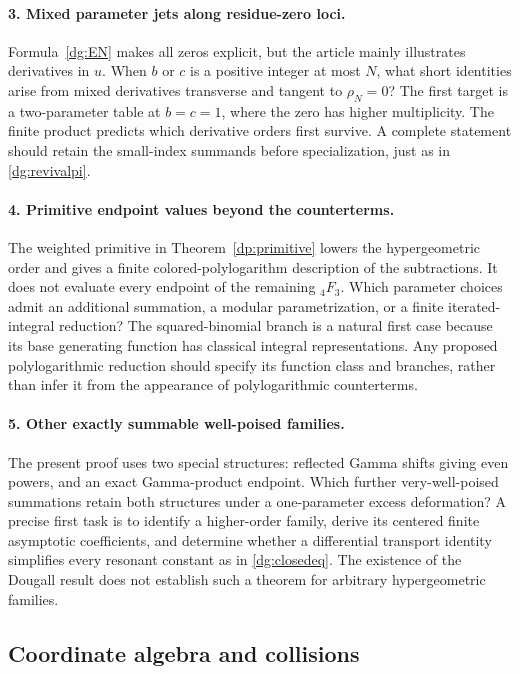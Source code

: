 \documentclass[11pt,a4paper]{article}
\numberwithin{equation}{section}
\theoremstyle{definition}
\theoremstyle{remark}
\begin{document}
\paragraph{3. Mixed parameter jets along residue-zero loci.}
Formula~\eqref{dg:EN} makes all zeros explicit, but the article mainly
illustrates derivatives in $u$. When $b$ or $c$ is a positive integer
at most $N$, what short identities arise from mixed derivatives
transverse and tangent to $\rho_N=0$? The first target is a
two-parameter table at $b=c=1$, where the zero has higher multiplicity.
The finite product predicts which derivative orders first survive.
A complete statement should retain the small-index summands before
specialization, just as in \eqref{dg:revivalpi}.

\paragraph{4. Primitive endpoint values beyond the counterterms.}
The weighted primitive in Theorem~\ref{dp:primitive} lowers the
hypergeometric order and gives a finite colored-polylogarithm
description of the subtractions. It does not evaluate every endpoint
of the remaining \({}_4F_3\). Which parameter choices admit an
additional summation, a modular parametrization, or a finite
iterated-integral reduction? The squared-binomial branch is a
natural first case because its base generating function has
classical integral representations. Any proposed polylogarithmic
reduction should specify its function class and branches, rather
than infer it from the appearance of polylogarithmic counterterms.

\paragraph{5. Other exactly summable well-poised families.}
The present proof uses two special structures: reflected Gamma
shifts giving even powers, and an exact Gamma-product endpoint.
Which further very-well-poised summations retain both structures
under a one-parameter excess deformation? A precise first task is
to identify a higher-order family, derive its centered finite
asymptotic coefficients, and determine whether a differential
transport identity simplifies every resonant constant as in
\eqref{dg:closedeq}. The existence of the Dougall result does not
establish such a theorem for arbitrary hypergeometric families.

\subsection{Coordinate algebra and collisions}
\end{document}
